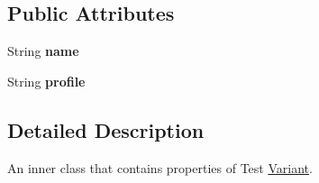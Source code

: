 \subsection*{Public Attributes}
\begin{DoxyCompactItemize}
\item 
\hypertarget{classcom_1_1shephertz_1_1app42_1_1paas_1_1sdk_1_1windows_1_1abtest_1_1_a_b_test_1_1_variant_a0cf6555df24c40730002c8ecf4836219}{String {\bfseries name}}\label{classcom_1_1shephertz_1_1app42_1_1paas_1_1sdk_1_1windows_1_1abtest_1_1_a_b_test_1_1_variant_a0cf6555df24c40730002c8ecf4836219}

\item 
\hypertarget{classcom_1_1shephertz_1_1app42_1_1paas_1_1sdk_1_1windows_1_1abtest_1_1_a_b_test_1_1_variant_a534210e6540e0aaea789ac0c9b2c16cd}{String {\bfseries profile}}\label{classcom_1_1shephertz_1_1app42_1_1paas_1_1sdk_1_1windows_1_1abtest_1_1_a_b_test_1_1_variant_a534210e6540e0aaea789ac0c9b2c16cd}

\end{DoxyCompactItemize}


\subsection{Detailed Description}
An inner class that contains properties of Test \hyperlink{classcom_1_1shephertz_1_1app42_1_1paas_1_1sdk_1_1windows_1_1abtest_1_1_a_b_test_1_1_variant}{Variant}. 

